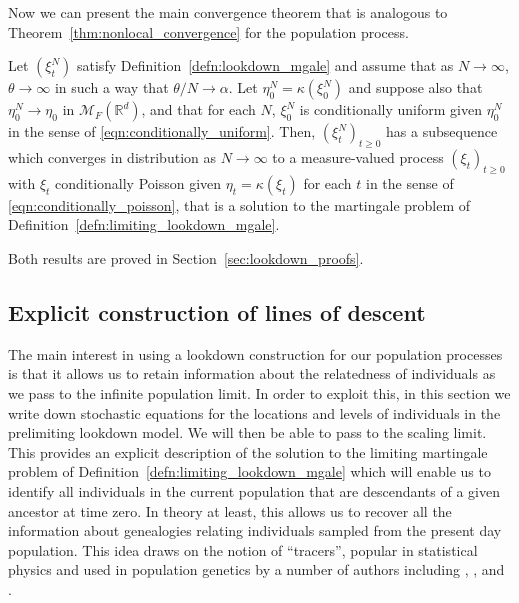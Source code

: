 \documentclass[EJP]{ejpecp} %
\newcommand{\IR}{\mathbb R}
\newcommand{\lp}{\xi}              %
\newcommand{\measures}{\mathcal{M}_F(\IR^d)} %
\newcommand{\citet}[1]{\cite{#1}}
\begin{document}
Now we can present the main convergence theorem that is analogous
to Theorem~\ref{thm:nonlocal_convergence} for the population process.

\begin{theorem}
    \label{thm:lookdown_convergence}
    Let $(\lp_t^N)$ satisfy Definition~\ref{defn:lookdown_mgale}
    and assume that as $N \to \infty$,
    $\theta \to \infty$ in such a way that $\theta/N \to \alpha$.
    Let $\eta_0^N = \kappa(\lp_0^N)$ and
    suppose also that $\eta^N_0 \to \eta_0$ in $\measures$,
    and that for each $N$, $\lp^N_0$ is conditionally uniform given $\eta_0^N$
    in the sense of \eqref{eqn:conditionally_uniform}.
    Then, $(\lp_t^N)_{t \ge 0}$ has a subsequence which converges in distribution as $N \to \infty$
    to a measure-valued process $(\lp_t)_{t \ge 0}$
    with $\lp_t$ conditionally Poisson given $\eta_t = \kappa(\lp_t)$ for each $t$
    in the sense of \eqref{eqn:conditionally_poisson},
    that is a solution to the martingale problem of Definition~\ref{defn:limiting_lookdown_mgale}.
\end{theorem}

Both results are proved in Section~\ref{sec:lookdown_proofs}.

\subsection{Explicit construction of lines of descent}
    \label{sec: individual lines of descent}

 
The main interest in using a lookdown construction for our population
processes is that it allows us to retain information about the 
relatedness of individuals as we pass to the infinite population limit.
In order to exploit this, in this section we write down stochastic 
equations for the locations and levels of individuals in the prelimiting lookdown model.
We will then be able to pass to the scaling limit.
This provides an explicit description of the solution to
the limiting martingale problem of Definition~\ref{defn:limiting_lookdown_mgale}
which will enable us to identify all 
individuals in the current population that are descendants of a
given ancestor at time zero. In theory at least, this allows us to
recover all the information about genealogies relating individuals 
sampled from the present day population. This idea draws on the notion
of ``tracers'', popular in statistical physics and used in population
genetics by a number of authors including 
\citet{hallatschek/nelson:2008}, \citet{durrett/fan:2016}, and \citet{biswas/etheridge/klimek:2018}.
\end{document}
